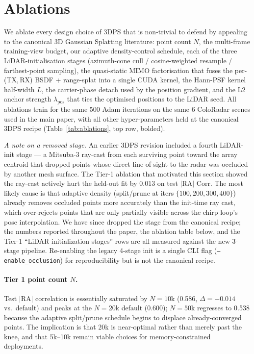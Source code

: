 \section{Ablations}
\label{app:ablations}

We ablate every design choice of 3DPS that is non-trivial to defend by appealing to the canonical 3D Gaussian Splatting literature: point count $N$, the multi-frame training-view budget, our adaptive density-control schedule, each of the three LiDAR-initialisation stages (azimuth-cone cull / cosine-weighted resample / farthest-point sampling), the quasi-static MIMO factorisation that fuses the per-(TX,\,RX) BSDF + range-splat into a single CUDA kernel, the Hann-PSF kernel half-width $L$, the carrier-phase detach used by the position gradient, and the L2 anchor strength $\lambda_{\mathrm{pos}}$ that ties the optimised positions to the LiDAR seed. All ablations train for the same 500 Adam iterations on the same 6 ColoRadar scenes used in the main paper, with all other hyper-parameters held at the canonical 3DPS recipe (Table~\ref{tab:ablations}, top row, bolded).

\textit{A note on a removed stage.} An earlier 3DPS revision included a fourth LiDAR-init stage --- a Mitsuba-3 ray-cast from each surviving point toward the array centroid that dropped points whose direct line-of-sight to the radar was occluded by another mesh surface. The Tier-1 ablation that motivated this section showed the ray-cast actively hurt the held-out fit by $0.013$ on test $|\mathrm{RA}|$ Corr. The most likely cause is that adaptive density (split/prune at iters $\{100, 200, 300, 400\}$) already removes occluded points more accurately than the init-time ray cast, which over-rejects points that are only partially visible across the chirp loop's pose interpolation. We have since dropped the stage from the canonical recipe; the numbers reported throughout the paper, the ablation table below, and the Tier-1 ``LiDAR initialization stages'' rows are all measured against the new 3-stage pipeline. Re-enabling the legacy 4-stage init is a single CLI flag (\texttt{--enable\_occlusion}) for reproducibility but is not the canonical recipe.



\paragraph{Tier 1 \textemdash{} point count $N$.} Test $|\mathrm{RA}|$ correlation is essentially saturated by $N{=}10$k (0.586, $\Delta{=}-0.014$ vs.\ default) and peaks at the $N{=}20$k default (0.600); $N{=}50$k regresses to 0.538 because the adaptive split/prune schedule begins to displace already-converged points. The implication is that 20k is near-optimal rather than merely past the knee, and that 5k--10k remain viable choices for memory-constrained deployments.

